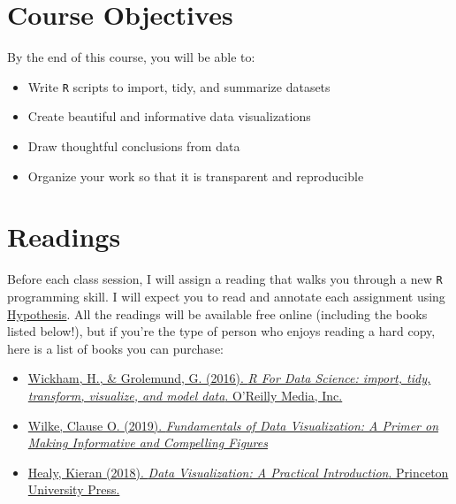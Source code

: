 \documentclass[11pt, letterpaper]{article}
\begin{document}

\section*{Course Objectives}
By the end of this course, you will be able to:
\begin{itemize}
	\item Write \texttt{R} scripts to import, tidy, and summarize datasets
	\item Create beautiful and informative data visualizations 
	\item Draw thoughtful conclusions from data
	\item Organize your work so that it is transparent and reproducible
\end{itemize}

\section*{Readings}

Before each class session, I will assign a reading that walks you through a new \texttt{R} programming skill. I will expect you to read and annotate each assignment using \href{https://joeornstein.github.io/pols-3230/index.html#hypothesis}{Hypothesis}. All the readings will be available free online (including the books listed below!), but if you're the type of person who enjoys reading a hard copy, here is a list of books you can purchase:

\begin{itemize}
	\item \href{https://r4ds.had.co.nz/}{Wickham, H., \& Grolemund, G. (2016). \textit{R For Data Science: import, tidy, transform, visualize, and model data}. O'Reilly Media, Inc.}

	\item \href{https://clauswilke.com/dataviz/}{Wilke, Clause O. (2019). \textit{Fundamentals of Data Visualization: A Primer on Making Informative and Compelling Figures}}
	
	\item \href{https://socviz.co/}{Healy, Kieran (2018). \textit{Data Visualization: A Practical Introduction}. Princeton University Press.} 
	
	
\end{itemize} 
\end{document}
